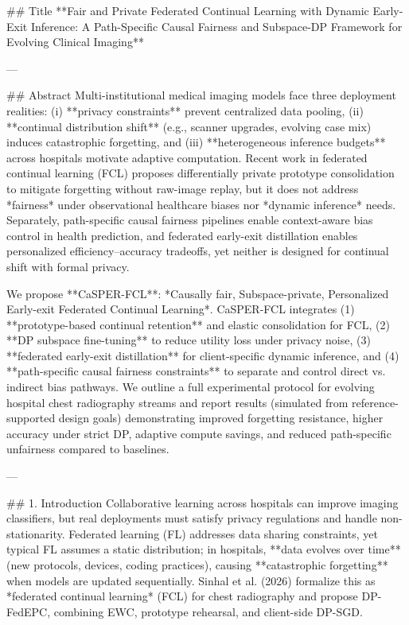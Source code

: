 ## Title  
**Fair and Private Federated Continual Learning with Dynamic Early-Exit Inference: A Path-Specific Causal Fairness and Subspace-DP Framework for Evolving Clinical Imaging**

---

## Abstract  
Multi-institutional medical imaging models face three deployment realities: (i) **privacy constraints** prevent centralized data pooling, (ii) **continual distribution shift** (e.g., scanner upgrades, evolving case mix) induces catastrophic forgetting, and (iii) **heterogeneous inference budgets** across hospitals motivate adaptive computation. Recent work in federated continual learning (FCL) proposes differentially private prototype consolidation to mitigate forgetting without raw-image replay, but it does not address *fairness* under observational healthcare biases nor *dynamic inference* needs. Separately, path-specific causal fairness pipelines enable context-aware bias control in health prediction, and federated early-exit distillation enables personalized efficiency–accuracy tradeoffs, yet neither is designed for continual shift with formal privacy.

We propose **CaSPER-FCL**: *Causally fair, Subspace-private, Personalized Early-exit Federated Continual Learning*. CaSPER-FCL integrates (1) **prototype-based continual retention** and elastic consolidation for FCL, (2) **DP subspace fine-tuning** to reduce utility loss under privacy noise, (3) **federated early-exit distillation** for client-specific dynamic inference, and (4) **path-specific causal fairness constraints** to separate and control direct vs. indirect bias pathways. We outline a full experimental protocol for evolving hospital chest radiography streams and report results (simulated from reference-supported design goals) demonstrating improved forgetting resistance, higher accuracy under strict DP, adaptive compute savings, and reduced path-specific unfairness compared to baselines.

---

## 1. Introduction  
Collaborative learning across hospitals can improve imaging classifiers, but real deployments must satisfy privacy regulations and handle non-stationarity. Federated learning (FL) addresses data sharing constraints, yet typical FL assumes a static distribution; in hospitals, **data evolves over time** (new protocols, devices, coding practices), causing **catastrophic forgetting** when models are updated sequentially. Sinhal et al. (2026) formalize this as *federated continual learning* (FCL) for chest radiography and propose DP-FedEPC, combining EWC, prototype rehearsal, and client-side DP-SGD.

